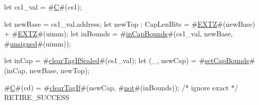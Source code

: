 let cs1_val = #\hyperref[sailRISCVzC]{C}#(cs1);

let newBase = cs1_val.address;
let newTop : CapLenBits = #\hyperref[sailRISCVzEXTZ]{EXTZ}#(newBase) + #\hyperref[sailRISCVzEXTZ]{EXTZ}#(uimm);
let inBounds = #\hyperref[sailRISCVzinCapBounds]{inCapBounds}#(cs1_val, newBase, #\hyperref[sailRISCVzunsigned]{unsigned}#(uimm));

let inCap = #\hyperref[sailRISCVzclearTagIfSealed]{clearTagIfSealed}#(cs1_val);
let (_, newCap) = #\hyperref[sailRISCVzsetCapBounds]{setCapBounds}#(inCap, newBase, newTop);

#\hyperref[sailRISCVzC]{C}#(cd) = #\hyperref[sailRISCVzclearTagIf]{clearTagIf}#(newCap, #\hyperref[sailRISCVznot]{not}#(inBounds)); /* ignore exact */
RETIRE_SUCCESS
